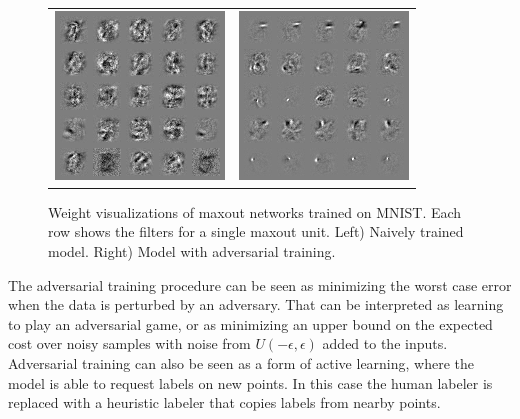 \documentclass{article} %
\def\eps{{\epsilon}}
\begin{document}
\begin{figure}
    \vspace{-.05in}
    \centering
    \begin{tabular}{cc}
        \includegraphics[width=.3\textwidth]{naive_weights.png} &
        \includegraphics[width=.3\textwidth]{adv_weights.png}
    \end{tabular}
    \caption{Weight visualizations of maxout networks trained on MNIST. Each row shows
        the filters for a single maxout unit. Left) Naively trained model.
    Right) Model with adversarial training.}
    \label{fig:weights}
    \vspace{-.2in}
\end{figure}
The adversarial training procedure can be seen as minimizing the worst case error when the data is perturbed by an
adversary. That can be interpreted as learning to play an adversarial game, or as minimizing an
upper bound on the expected cost over noisy samples with noise from $U(-\eps, \eps)$ added to the
inputs. Adversarial training can also be seen as a form of active learning, where the model is
able to request labels on new points. In this case the human labeler is replaced with a heuristic
labeler that copies labels from nearby points.
\end{document}
